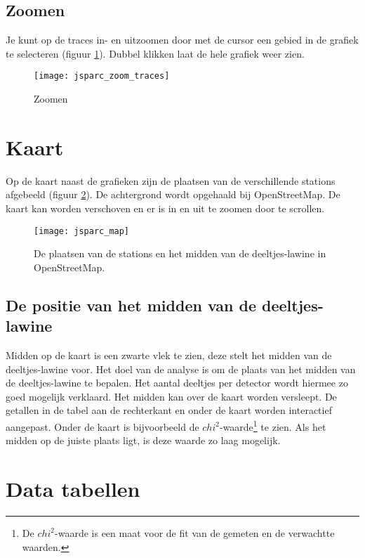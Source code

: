 \subsection{Zoomen}

Je kunt op de traces in- en uitzoomen door met de cursor een gebied in de
grafiek te selecteren (figuur \ref{fig:zoomen}). Dubbel klikken laat de hele grafiek weer zien.

\begin{figure}[H]
    \centering
    \texttt{[image: jsparc\_zoom\_traces]}
    \caption{Zoomen}
    \label{fig:zoomen}
\end{figure}

\section{Kaart}

Op de kaart naast de grafieken zijn de plaatsen van de verschillende \hisparc stations
afgebeeld (figuur \ref{fig:core}). De achtergrond wordt opgehaald bij OpenStreetMap. De kaart kan
worden verschoven en er is in en uit te zoomen door te scrollen.

\begin{figure}[H]
    \centering
    \texttt{[image: jsparc\_map]}
    \caption{De plaatsen van de stations en het midden van de deeltjes-lawine in OpenStreetMap.}
    \label{fig:core}
\end{figure}

\subsection{De positie van het midden van de deeltjes-lawine}

Midden op de kaart is een zwarte vlek te zien, deze stelt het midden van de
deeltjes-lawine voor. Het doel van de analyse is om de plaats van het midden
van de deeltjes-lawine te bepalen. Het aantal deeltjes per detector wordt
hiermee zo goed mogelijk verklaard. Het midden kan over de kaart worden
versleept. De getallen in de tabel aan de rechterkant en onder de kaart worden
interactief aangepast. Onder de kaart is bijvoorbeeld de $chi^{2}$-waarde\footnote{De $chi^{2}$-waarde is een maat voor de fit van de gemeten en de verwachtte waarden.}
te zien. Als het midden op de juiste plaats ligt, is deze waarde zo laag
mogelijk.


\section{Data tabellen}

